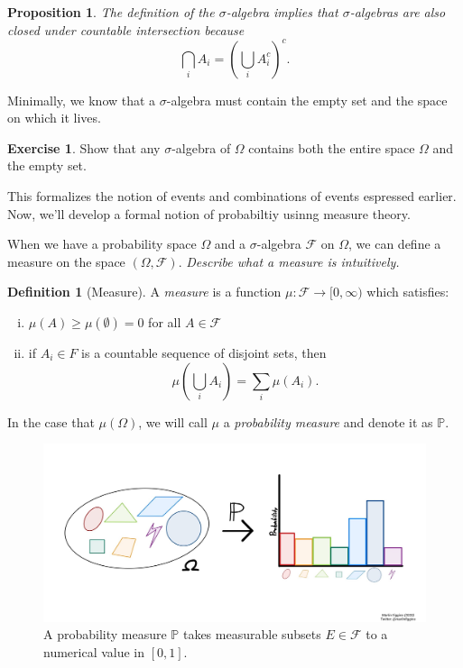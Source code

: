 \documentclass[12pt]{article}
\newcommand{\calF}{\mathcal{F}}
\newcommand{\Prob}{\mathbb{P}}
\newtheorem{prop}[thm]{Proposition}
\theoremstyle{definition}
\newtheorem{defn}[thm]{Definition}
\newtheorem{exer}[thm]{Exercise}
\theoremstyle{remark}
\numberwithin{equation}{section}
\begin{document}
 \begin{prop}
 The definition of the $\sigma$-algebra implies that $\sigma$-algebras are also closed under countable intersection because
 \begin{equation}
   \bigcap_i A_i = \left( \bigcup_i A_i^c \right)^c.
 \end{equation}
 \end{prop}

Minimally, we know that a $\sigma$-algebra must contain the empty set and the space on which it lives. 

\begin{exer}
   Show that any $\sigma$-algebra of $\Omega$ contains both the entire space $\Omega$ and the empty set.
\end{exer}

This formalizes the notion of events and combinations of events espressed earlier. Now, we'll develop a formal notion of probabiltiy usinng measure theory.

 When we have a probability space $\Omega$ and a $\sigma$-algebra $\calF$ on $\Omega$, we can define a measure on the space $(\Omega, \calF)$. \emph{Describe what a measure is intuitively.}

 \begin{defn}[Measure]
   A \emph{measure} is a function $\mu: \calF \to [0, \infty)$ which satisfies:
   \begin{enumerate}[(i)]
     \item $\mu(A) \geq \mu(\emptyset) = 0$ for all $A\in\calF$
     \item if $A_i \in F$ is a countable sequence of disjoint sets, then 
       \begin{equation}
         \mu\left(\bigcup_i A_i \right) = \sum_i \mu(A_i).
       \end{equation}
   \end{enumerate}
   In the case that $\mu(\Omega)$, we will call $\mu$ a \emph{probability measure} and denote it as $\Prob$.
 \end{defn}

 \begin{figure}[ht]
   \centering
   \includegraphics[width=0.9\linewidth]{intro-to-prob-measure.jpg}
   \caption{A probability measure $\Prob$ takes measurable subsets $E\in \calF$ to a numerical value in $[0,1]$.}%
   \label{fig:intro-to-prob-measure}
 \end{figure}
\end{document}
